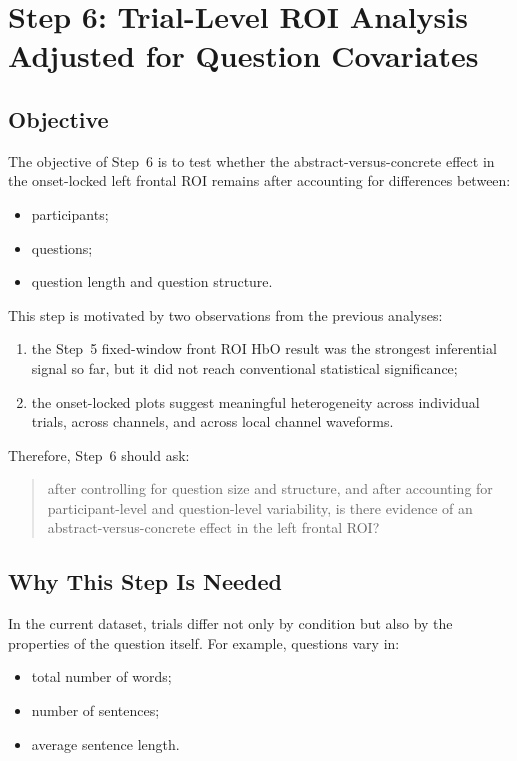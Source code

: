 \documentclass[11pt]{article}
\begin{document}
\sloppy
\section{Step 6: Trial-Level ROI Analysis Adjusted for Question Covariates}
\label{sec:step6_covariates}

\subsection{Objective}
The objective of Step~6 is to test whether the abstract-versus-concrete effect in the onset-locked
left frontal ROI remains after accounting for differences between:
\begin{itemize}
    \item participants;
    \item questions;
    \item question length and question structure.
\end{itemize}

This step is motivated by two observations from the previous analyses:
\begin{enumerate}
    \item the Step~5 fixed-window front ROI HbO result was the strongest inferential signal so far,
    but it did not reach conventional statistical significance;
    \item the onset-locked plots suggest meaningful heterogeneity across individual trials,
    across channels, and across local channel waveforms.
\end{enumerate}

Therefore, Step~6 should ask:
\begin{quote}
after controlling for question size and structure, and after accounting for participant-level and
question-level variability, is there evidence of an abstract-versus-concrete effect in the left
frontal ROI?
\end{quote}

\subsection{Why This Step Is Needed}
In the current dataset, trials differ not only by condition but also by the properties of the question itself.
For example, questions vary in:
\begin{itemize}
    \item total number of words;
    \item number of sentences;
    \item average sentence length.
\end{itemize}
\end{document}
